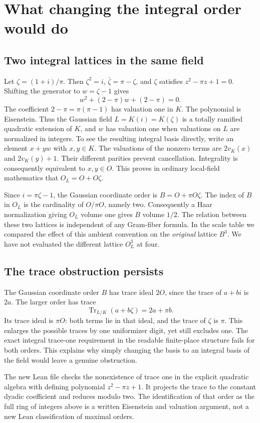 \documentclass[12pt,letterpaper]{article}
\begin{document}
\section{What changing the integral order would do}
\subsection{Two integral lattices in the same field}
Let $\zeta=(1+i)/\pi$. Then $\zeta^2=i$, $\bar\zeta=\pi-\zeta$, and $\zeta$ satisfies $z^2-\pi z+1=0$. Shifting the generator to $w=\zeta-1$ gives
\[
                 w^2+(2-\pi)w+(2-\pi)=0.
\]
The coefficient $2-\pi=\pi(\pi-1)$ has valuation one in $K$. The polynomial is Eisenstein. Thus the Gaussian field $L=K(i)=K(\zeta)$ is a totally ramified quadratic extension of $K$, and $w$ has valuation one when valuations on $L$ are normalized in integers. To see the resulting integral basis directly, write an element $x+yw$ with $x,y\in K$. The valuations of the nonzero terms are $2v_K(x)$ and $2v_K(y)+1$. Their different parities prevent cancellation. Integrality is consequently equivalent to $x,y\in O$. This proves in ordinary local-field mathematics that $O_L=O+O\zeta$.

Since $i=\pi\zeta-1$, the Gaussian coordinate order is $B=O+\pi O\zeta$. The index of $B$ in $O_L$ is the cardinality of $O/\pi O$, namely two. Consequently a Haar normalization giving $O_L$ volume one gives $B$ volume $1/2$. The relation between these two lattices is independent of any Gram-fiber formula. In the scale table we compared the effect of this ambient convention on the \emph{original} lattice $B^3$. We have not evaluated the different lattice $O_L^3$ at four.

\subsection{The trace obstruction persists}
The Gaussian coordinate order $B$ has trace ideal $2O$, since the trace of $a+bi$ is $2a$. The larger order has trace
\[
                  \operatorname{Tr}_{L/K}(a+b\zeta)=2a+\pi b.
\]
Its trace ideal is $\pi O$: both terms lie in that ideal, and the trace of $\zeta$ is $\pi$. This enlarges the possible traces by one uniformizer digit, yet still excludes one. The exact integral trace-one requirement in the readable finite-place structure fails for both orders. This explains why simply changing the basis to an integral basis of the field would leave a genuine obstruction.

The new Lean file checks the nonexistence of trace one in the explicit quadratic algebra with defining polynomial $z^2-\pi z+1$. It projects the trace to the constant dyadic coefficient and reduces modulo two. The identification of that order as the full ring of integers above is a written Eisenstein and valuation argument, not a new Lean classification of maximal orders.
\end{document}
